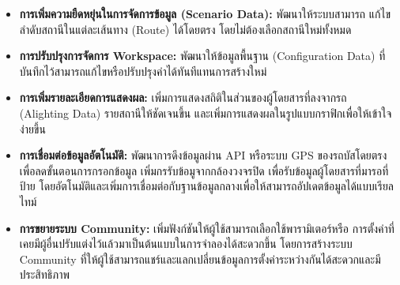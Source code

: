 \begin{itemize}
    \item \textbf{การเพิ่มความยืดหยุ่นในการจัดการข้อมูล (Scenario Data):} พัฒนาให้ระบบสามารถ
    แก้ไขลำดับสถานีในแต่ละเส้นทาง (Route) ได้โดยตรง โดยไม่ต้องเลือกสถานีใหม่ทั้งหมด
    \item \textbf{การปรับปรุงการจัดการ Workspace:} พัฒนาให้ข้อมูลพื้นฐาน (Configuration Data) 
    ที่บันทึกไว้สามารถแก้ไขหรือปรับปรุงค่าได้ทันทีแทนการสร้างใหม่
    \item \textbf{การเพิ่มรายละเอียดการแสดงผล:} เพิ่มการแสดงสถิติในส่วนของผู้โดยสารที่ลงจากรถ
     (Alighting Data) รายสถานีให้ชัดเจนขึ้น และเพิ่มการแสดงผลในรูปแบบกราฟิกเพื่อให้เข้าใจง่ายขึ้น
    \item \textbf{การเชื่อมต่อข้อมูลอัตโนมัติ:} พัฒนาการดึงข้อมูลผ่าน API หรือระบบ GPS 
    ของรถบัสโดยตรงเพื่อลดขั้นตอนการกรอกข้อมูล เพิ่มกรรับข้อมูจากกล้องวงจรปิด เพื่อรับข้อมูลผู้โดยสารที่มารอที่ป้าย
    โดยอัตโนมัติและเพิ่มการเชื่อมต่อกับฐานข้อมูลกลางเพื่อให้สามารถอัปเดตข้อมูลได้แบบเรียลไทม์
    \item \textbf{การขยายระบบ Community:} เพิ่มฟังก์ชันให้ผู้ใช้สามารถเลือกใช้พารามิเตอร์หรือ
    การตั้งค่าที่เคยมีผู้อื่นปรับแต่งไว้แล้วมาเป็นต้นแบบในการจำลองได้สะดวกขึ้น โดยการสร้างระบบ Community 
    ที่ให้ผู้ใช้สามารถแชร์และแลกเปลี่ยนข้อมูลการตั้งค่าระหว่างกันได้สะดวกและมีประสิทธิภาพ
\end{itemize}
